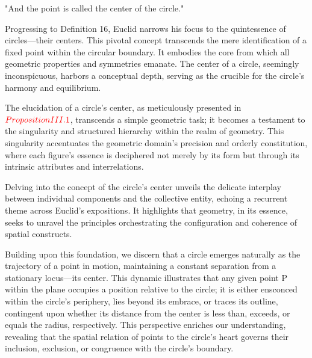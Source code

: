 
\begin{defin}
"And the point is called the center of the circle."
\end{defin}

Progressing to Definition 16, Euclid narrows his focus to the quintessence of circles—their centers. This pivotal concept transcends the mere identification of a fixed point within the circular boundary. It embodies the core from which all geometric properties and symmetries emanate. The center of a circle, seemingly inconspicuous, harbors a conceptual depth, serving as the crucible for the circle’s harmony and equilibrium.

The elucidation of a circle’s center, as meticulously presented in $\textcolor{red}{Proposition III.1}$, transcends a simple geometric task; it becomes a testament to the singularity and structured hierarchy within the realm of geometry. This singularity accentuates the geometric domain's precision and orderly constitution, where each figure’s essence is deciphered not merely by its form but through its intrinsic attributes and interrelations.

Delving into the concept of the circle's center unveils the delicate interplay between individual components and the collective entity, echoing a recurrent theme across Euclid’s expositions. It highlights that geometry, in its essence, seeks to unravel the principles orchestrating the configuration and coherence of spatial constructs.

Building upon this foundation, we discern that a circle emerges naturally as the trajectory of a point in motion, maintaining a constant separation from a stationary locus—its center. This dynamic illustrates that any given point P within the plane occupies a position relative to the circle; it is either ensconced within the circle's periphery, lies beyond its embrace, or traces its outline, contingent upon whether its distance from the center is less than, exceeds, or equals the radius, respectively. This perspective enriches our understanding, revealing that the spatial relation of points to the circle's heart governs their inclusion, exclusion, or congruence with the circle's boundary.

\clearpage